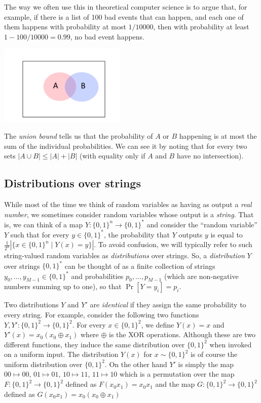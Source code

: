 The way we often use this in theoretical computer science is to argue
that, for example, if there is a list of 100 bad events that can happen,
and each one of them happens with probability at most \(1/10000\), then
with probability at least \(1-100/10000 = 0.99\), no bad event happens.

\begin{marginfigure}
\centering
\includegraphics[width=\linewidth, height=1.5in, keepaspectratio]{../figure/unionbound.png}
\caption{The \emph{union bound} tells us that the probability of \(A\)
or \(B\) happening is at most the sum of the individual probabilities.
We can see it by noting that for every two sets
\(|A\cup B| \leq |A|+|B|\) (with equality only if \(A\) and \(B\) have
no intersection).}
\label{unionboundfig}
\end{marginfigure}

\subsection{Distributions over strings}\label{0-Distributions-over-str}

While most of the time we think of random variables as having as output
a \emph{real number}, we sometimes consider random variables whose
output is a \emph{string}. That is, we can think of a map
\(Y:\{0,1\}^n \rightarrow \{0,1\}^*\) and consider the ``random
variable'' \(Y\) such that for every \(y\in \{0,1\}^*\), the probability
that \(Y\) outputs \(y\) is equal to
\(\tfrac{1}{2^n}\left| \{ x \in \{0,1\}^n \;|\; Y(x)=y \}\right|\). To
avoid confusion, we will typically refer to such string-valued random
variables as \emph{distributions} over strings. So, a
\emph{distribution} \(Y\) over strings \(\{0,1\}^*\) can be thought of
as a finite collection of strings \(y_0,\ldots,y_{M-1} \in \{0,1\}^*\)
and probabilities \(p_0,\ldots,p_{M-1}\) (which are non-negative numbers
summing up to one), so that \(\Pr[ Y = y_i ] = p_i\).

Two distributions \(Y\) and \(Y'\) are \emph{identical} if they assign
the same probability to every string. For example, consider the
following two functions \(Y,Y':\{0,1\}^2 \rightarrow \{0,1\}^2\). For
every \(x \in \{0,1\}^2\), we define \(Y(x)=x\) and
\(Y'(x)=x_0(x_0\oplus x_1)\) where \(\oplus\) is the XOR operations.
Although these are two different functions, they induce the same
distribution over \(\{0,1\}^2\) when invoked on a uniform input. The
distribution \(Y(x)\) for \(x\sim \{0,1\}^2\) is of course the uniform
distribution over \(\{0,1\}^2\). On the other hand \(Y'\) is simply the
map \(00 \mapsto 00\), \(01 \mapsto 01\), \(10 \mapsto 11\),
\(11 \mapsto 10\) which is a permutation over the map
\(F:\{0,1\}^2 \rightarrow \{0,1\}^2\) defined as \(F(x_0x_1)=x_0x_1\)
and the map \(G:\{0,1\}^2 \rightarrow \{0,1\}^2\) defined as
\(G(x_0x_1)=x_0(x_0 \oplus x_1)\)


